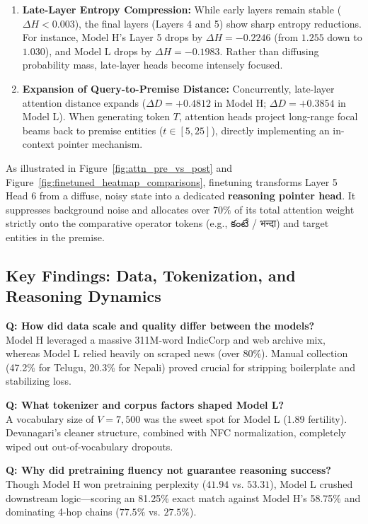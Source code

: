 \documentclass[8pt]{article}
\newcommand{\telugu}[1]{{\telugufont #1}}
\newcommand{\nepali}[1]{{\nepalifont #1}}
\begin{document}
\begin{enumerate}
    \item \textbf{Late-Layer Entropy Compression:} While early layers remain stable ($\Delta H < 0.003$), the final layers (Layers 4 and 5) show sharp entropy reductions. For instance, Model H's Layer 5 drops by $\Delta H = -0.2246$ (from $1.255$ down to $1.030$), and Model L drops by $\Delta H = -0.1983$. Rather than diffusing probability mass, late-layer heads become intensely focused.
    \item \textbf{Expansion of Query-to-Premise Distance:} Concurrently, late-layer attention distance expands ($\Delta D = +0.4812$ in Model H; $\Delta D = +0.3854$ in Model L). When generating token $T$, attention heads project long-range focal beams back to premise entities ($t \in [5, 25]$), directly implementing an in-context pointer mechanism.
\end{enumerate}

As illustrated in Figure~\ref{fig:attn_pre_vs_post} and Figure~\ref{fig:finetuned_heatmap_comparisons}, finetuning transforms Layer 5 Head 6 from a diffuse, noisy state into a dedicated \textbf{reasoning pointer head}. It suppresses background noise and allocates over $70\%$ of its total attention weight strictly onto the comparative operator tokens (e.g., \telugu{కంటే} / \nepali{भन्दा}) and target entities in the premise.

\subsection{Key Findings: Data, Tokenization, and Reasoning Dynamics}
\label{subsec:key_findings}

\noindent\textbf{Q: How did data scale and quality differ between the models?} \\
Model H leveraged a massive 311M-word IndicCorp and web archive mix, whereas Model L relied heavily on scraped news (over 80\%). Manual collection (47.2\% for Telugu, 20.3\% for Nepali) proved crucial for stripping boilerplate and stabilizing loss.

\vspace{0.5em}
\noindent\textbf{Q: What tokenizer and corpus factors shaped Model L?} \\
A vocabulary size of $V = 7,500$ was the sweet spot for Model L (1.89 fertility). Devanagari's cleaner structure, combined with NFC normalization, completely wiped out out-of-vocabulary dropouts.

\vspace{0.5em}
\noindent\textbf{Q: Why did pretraining fluency not guarantee reasoning success?} \\
Though Model H won pretraining perplexity ($41.94$ vs. $53.31$), Model L crushed downstream logic—scoring an 81.25\% exact match against Model H's 58.75\% and dominating 4-hop chains ($77.5\%$ vs. $27.5\%$).
\end{document}
